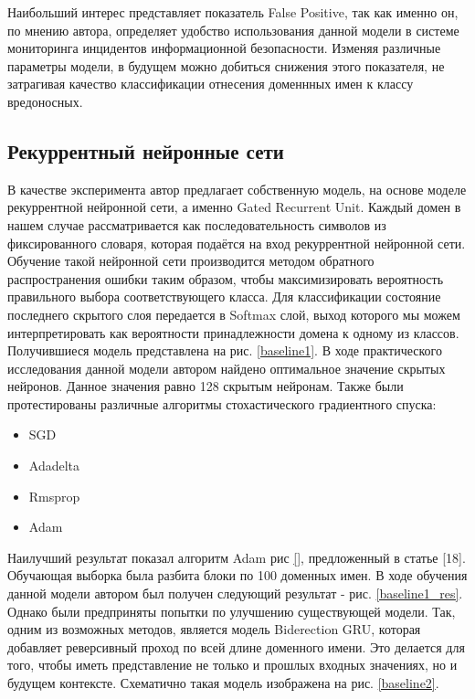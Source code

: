     Наибольший интерес представляет показатель False Positive, так как именно он, по мнению автора, определяет удобство использования данной модели в системе мониторинга инцидентов информационной безопасности. Изменяя различные параметры модели, в будущем можно добиться снижения этого показателя, не затрагивая качество классификации отнесения доменнных имен к классу вредоносных.
    \subsection{Рекуррентный нейронные сети}\label{lstm_class_exp}
    В качестве эксперимента автор предлагает собственную модель, на основе моделе рекуррентной нейронной сети, а именно Gated Recurrent Unit. Каждый домен в нашем случае рассматривается как последовательность символов из фиксированного словаря, которая подаётся на вход рекуррентной нейронной сети. Обучение такой нейронной сети производится методом обратного распространения ошибки таким образом, чтобы максимизировать вероятность правильного выбора соответствующего класса. Для классификации состояние последнего скрытого слоя передается в Softmax слой, выход которого мы можем интерпретировать как вероятности принадлежности домена к одному из классов. Получившиеся модель представлена на рис. \ref{baseline1}.
    В ходе практического исследования данной модели автором найдено оптимальное значение скрытых нейронов. Данное значения равно 128 скрытым нейронам. %
    Также были протестированы различные алгоритмы стохастического градиентного спуска:
    \begin{itemize}
    \item SGD
    \item Adadelta
    \item Rmsprop
    \item Adam
    \end{itemize}
    Наилучший результат показал алгоритм Adam рис \ref{}, предложенный в статье [18]. %
    Обучающая выборка была разбита блоки по 100 доменных имен. В ходе обучения данной модели автором был получен следующий результат - рис. \ref{baseline1_res}.
    Однако были предприняты попытки по улучшению существующей модели. Так, одним из возможных методов, является модель Biderection GRU, которая добавляет реверсивный проход по всей длине доменного имени. Это делается для того, чтобы иметь представление не только и прошлых входных значениях, но и будущем контексте. Схематично такая модель изображена на рис. \ref{baseline2}.
